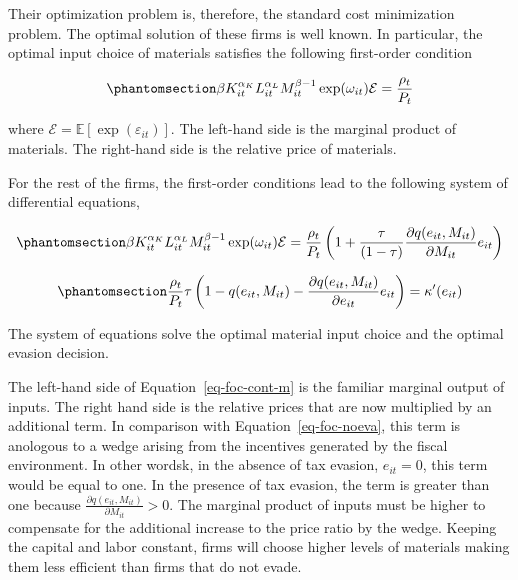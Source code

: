 \documentclass[
  12pt]{article}
\theoremstyle{definition}
\theoremstyle{remark}
\begin{document}
Their optimization problem is, therefore, the standard cost minimization
problem. The optimal solution of these firms is well known. In
particular, the optimal input choice of materials satisfies the
following first-order condition

\begin{equation}\phantomsection\label{eq-foc-noeva}{
\beta K_{it}^{\alpha_K}L_{it}^{\alpha_L}M_{it}^{\beta-1}\exp(\omega_{it})\mathcal{E}=\frac{\rho_{t}}{P_t}
}\end{equation}

where \(\mathcal{E}=\mathbb{E}[\exp(\varepsilon_{it})]\). The left-hand
side is the marginal product of materials. The right-hand side is the
relative price of materials.

For the rest of the firms, the first-order conditions lead to the
following system of differential equations,

\begin{equation}\phantomsection\label{eq-foc-cont-m}{
\beta K_{it}^{\alpha_K}L_{it}^{\alpha_L}M_{it}^{\beta-1}\exp(\omega_{it})\mathcal{E}=\frac{\rho_{t}}{P_t}\left(1+\frac{\tau}{(1-\tau)}\frac{\partial q(e_{it},M_{it})}{\partial M_{it}}e_{it}\right)
}\end{equation}

\begin{equation}\phantomsection\label{eq-foc-cont-e}{
\frac{\rho_t}{P_t}\tau\left(1-q(e_{it}, M_{it})-\frac{\partial q(e_{it}, M_{it})}{\partial e_{it}} e_{it}\right) =\kappa'(e_{it})
}\end{equation}

The system of equations solve the optimal material input choice and the
optimal evasion decision.

The left-hand side of Equation~\ref{eq-foc-cont-m} is the familiar
marginal output of inputs. The right hand side is the relative prices
that are now multiplied by an additional term. In comparison with
Equation~\ref{eq-foc-noeva}, this term is anologous to a wedge arising
from the incentives generated by the fiscal environment. In other
wordsk, in the absence of tax evasion, \(e_{it}=0\), this term would be
equal to one. In the presence of tax evasion, the term is greater than
one because \(\frac{\partial q(e_{it},M_{it})}{\partial M_{it}}>0\). The
marginal product of inputs must be higher to compensate for the
additional increase to the price ratio by the wedge. Keeping the capital
and labor constant, firms will choose higher levels of materials making
them less efficient than firms that do not evade.
\end{document}
